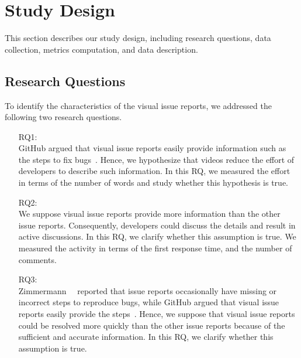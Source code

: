 \section{Study Design}
\label{sec:design}

This section describes our study design, including research questions, data collection, metrics computation, and data description.

\subsection{Research Questions}
\label{sec:rqs}

To identify the characteristics of the visual issue reports, we addressed the following two research questions. 
\begin{itemize}
	\item[RQ1:] \textbf{\RQone{}}\\
	GitHub argued that visual issue reports easily provide 
	information such as the steps to fix bugs~\citep{github-video-blog}. 
	Hence, we hypothesize that videos reduce the effort of 
	developers to describe such information. 
	In this RQ, we measured the effort in terms of 
	the number of words and 
	study whether this hypothesis is true. 
	\item[RQ2:] \textbf{\RQtwo{}}\\
	We suppose visual issue reports provide 
	more information than the other issue reports. 
	Consequently, developers could discuss the details and 
	result in active discussions. 
	In this RQ, we clarify whether this assumption is true. 
	We measured the activity in terms of 
	the first response time, and
	the number of comments.
	\item[RQ3:] \textbf{\RQthree{}}\\
	Zimmermann~\et~\citep{zimmermann2010TSE} reported that
	issue reports occasionally have missing or incorrect steps 
	to reproduce bugs, 
	while GitHub argued that visual issue reports easily 
	provide the steps~\citep{github-video-blog}. 
	Hence, we suppose that visual issue reports could be 
	resolved more quickly than the other issue reports 
	because of the sufficient and accurate information. 
	In this RQ, we clarify whether this assumption is true. 
\end{itemize}

